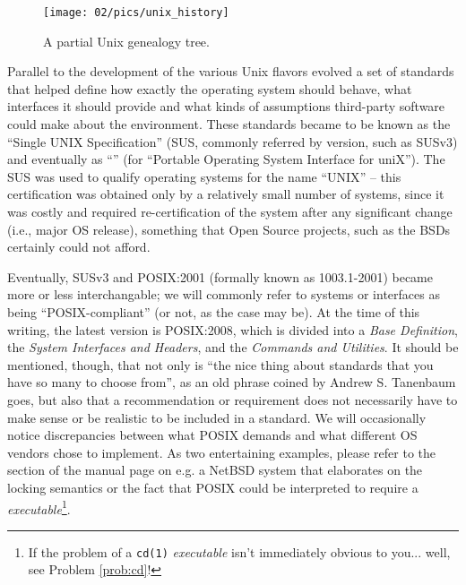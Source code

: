 \begin{figure}[t]
	\centering
	\texttt{[image: 02/pics/unix\_history]}
	\caption[Unix genealogy tree]{A partial Unix genealogy tree.
		\label{fig:unix-history}}
\end{figure}

Parallel to the development of the various Unix
flavors evolved a set of standards that helped define
how exactly the operating system should behave, what
interfaces it should provide and what kinds of
assumptions third-party software could make about the
environment.  These standards became to be known as
the ``Single UNIX Specification'' (SUS, commonly referred by version,
such as SUSv3) and eventually as
``'' (for
``Portable Operating System Interface for uniX'').
The SUS was used to qualify operating systems for the
name ``\textsc{UNIX}'' -- this
certification was obtained only by a relatively small
number of systems, since it was costly and required
re-certification of the system after any significant
change (i.e., major OS release), something that Open
Source projects, such as the BSDs certainly could not
afford.

Eventually, SUSv3 and POSIX:2001 (formally known as
 1003.1-2001)
became more or less interchangable; we will commonly
refer to systems or interfaces as being
``POSIX-compliant'' (or not, as the case may be).  At
the time of this writing, the latest version is
POSIX:2008\cite{history:posix2008}, which is divided
into a {\em Base Definition}, the {\em System
Interfaces and Headers}, and the {\em Commands and
Utilities}.  It should be mentioned, though, that
not only is ``the nice thing about standards that you
have so many to choose
from''\cite{history:tanenbaum-standards}, as an old
phrase coined by Andrew S.
Tanenbaum goes,
but also that a recommendation or requirement does not
necessarily have to make sense or be realistic to be
included in a standard.  We will occasionally notice
discrepancies between what POSIX demands and what
different OS vendors chose to implement.  As two
entertaining examples, please refer to the section of
the  manual page on e.g. a NetBSD
system\cite{history:fcntl} that elaborates on the
locking semantics or the fact that POSIX could be
interpreted to require a  {\em
executable}\footnote{If the problem of a {\tt cd(1)}
{\em executable} isn't immediately obvious to you...
well, see Problem \ref{prob:cd}!}.

